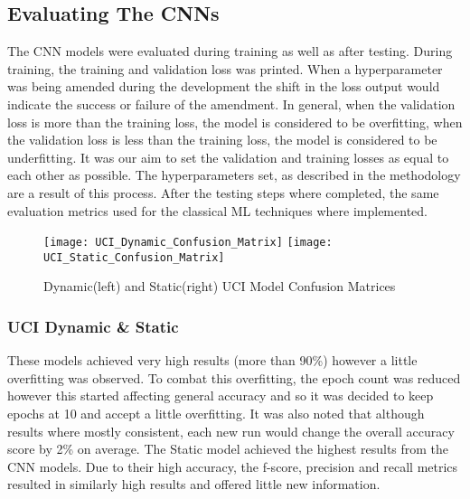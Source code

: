 \subsection{Evaluating The CNNs}
The CNN models were evaluated during training as well as after testing.
During training, the training and validation loss was printed.
When a hyperparameter was being amended during the development the shift in the loss output would indicate the success or failure of the amendment.
In general, when the validation loss is more than the training loss, the model is considered to be overfitting, when the validation loss is less than the training loss, the model is considered to be underfitting.
It was our aim to set the validation and training losses as equal to each other as possible.
The hyperparameters set, as described in the methodology are a result of this process.
After the testing steps where completed, the same evaluation metrics used for the classical ML techniques where implemented.

\begin{figure}[h]
\centering
\texttt{[image: UCI\_Dynamic\_Confusion\_Matrix]}\hfill
\texttt{[image: UCI\_Static\_Confusion\_Matrix]}\hfill
\caption*{Dynamic(left) and Static(right) UCI Model Confusion Matrices}
\label{fig:UCI_Confusions}
\end{figure}

\subsubsection{UCI Dynamic \& Static}
These models achieved very high results (more than 90\%) however a little overfitting was observed.
To combat this overfitting, the epoch count was reduced however this started affecting general accuracy and so it was decided to keep epochs at 10 and accept a little overfitting.
It was also noted that although results where mostly consistent, each new run would change the overall accuracy score by 2\% on average.
The Static model achieved the highest results from the CNN models.
Due to their high accuracy, the f-score, precision and recall metrics resulted in similarly high results and offered little new information.


